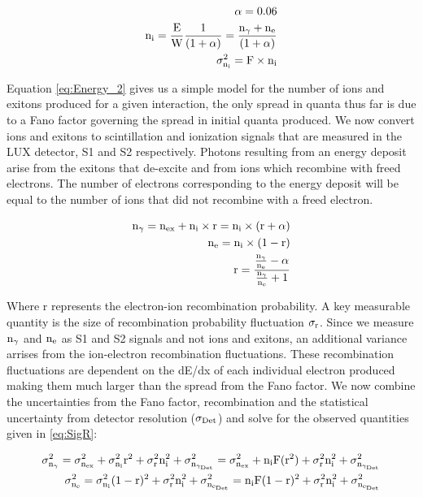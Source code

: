 \begin{equation}
\begin{split}
\rm \alpha = 0.06\\
\rm  n_i = \frac{E}{W} \frac{1}{(1+\alpha)} =  \frac{n_\gamma + n_e}{(1+\alpha)}  \\ %
\rm \sigma_{n_i}^2  = F \times n_i
\label{eq:Energy_2}
\end{split}
\end{equation}

Equation \ref{eq:Energy_2} gives us a simple model for the number of ions and exitons produced for a given interaction, the only spread in quanta thus far is due to a Fano factor governing the spread in initial quanta produced. We now convert ions and exitons to scintillation and ionization signals that are measured in the LUX detector, S1  and S2 respectively. Photons resulting from an energy deposit arise from the exitons that de-excite and from ions which recombine with freed electrons. The number of electrons corresponding to the energy deposit will be equal to the number of ions that did not recombine with a freed electron. 

\begin{equation}
\begin{split}
\rm  n_\gamma = n_{ex} + n_i\times r = n_i\times (r+\alpha) \\
\rm  n_e = n_i\times (1-r)\\
\rm r= \frac{\frac{n_\gamma}{n_e}-\alpha}{\frac{n_\gamma}{n_e} + 1}
\label{eq:Quanta}
\end{split}
\end{equation}

Where r represents the electron-ion recombination probability. A key measurable quantity is the size of recombination probability fluctuation $\rm \sigma_r$. Since we measure $\rm n_\gamma$ and $\rm n_e$ as S1 and S2 signals and not ions and exitons, an additional variance arrises from the ion-electron recombination fluctuations. These recombination fluctuations are dependent on the dE/dx of each individual electron produced making them much larger than the spread from the Fano factor. We now combine the uncertainties from the Fano factor, recombination and the statistical uncertainty from detector resolution ($\rm\sigma_{Det}$) and solve for the observed quantities given in \ref{eq:SigR}:

\begin{equation}
\begin{split}
\rm \sigma_{n_\gamma}^2  =\sigma_{n_{ex}}^2 + \sigma_{n_i}^2 r^2 +  \sigma_{r}^2 n_i^2 +\sigma_{n_{\gamma_{Det}}}^2 = \sigma_{n_{ex}}^2 + n_iF(r^2) + \sigma_{r}^2 n_i^2 + \sigma_{n_{\gamma_{Det}}}^2 \\
\rm \sigma_{n_e}^2  = \sigma_{n_i}^2 (1-r)^2 +  \sigma_{r}^2 n_i^2 +\sigma_{n_{e_{Det}}}^2= n_iF(1-r)^2+ \sigma_{r}^2 n_i^2 +\sigma_{n_{e_{Det}}}^2
\label{eq:SigR}
\end{split}
\end{equation}


